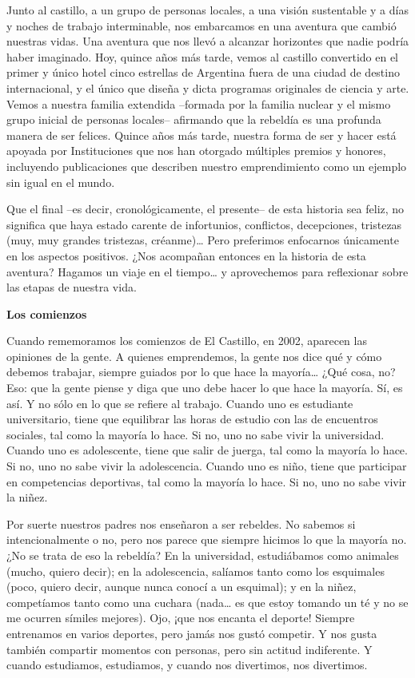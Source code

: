 Junto al castillo, a un grupo de personas locales, a una visión
sustentable y a días y noches de trabajo interminable, nos embarcamos en
una aventura que cambió nuestras vidas. Una aventura que nos llevó a
alcanzar horizontes que nadie podría haber imaginado. Hoy, quince años
más tarde, vemos al castillo convertido en el primer y único hotel cinco
estrellas de Argentina fuera de una ciudad de destino internacional, y
el único que diseña y dicta programas originales de ciencia y arte.
Vemos a nuestra familia extendida --formada por la familia nuclear y el
mismo grupo inicial de personas locales-- afirmando que la rebeldía es
una profunda manera de ser felices. Quince años más tarde, nuestra forma
de ser y hacer está apoyada por Instituciones que nos han otorgado
múltiples premios y honores, incluyendo publicaciones que describen
nuestro emprendimiento como un ejemplo sin igual en el mundo.

Que el final --es decir, cronológicamente, el presente-- de esta
historia sea feliz, no significa que haya estado carente de infortunios,
conflictos, decepciones, tristezas (muy, muy grandes tristezas,
créanme)\ldots{} Pero preferimos enfocarnos únicamente en los aspectos
positivos. ¿Nos acompañan entonces en la historia de esta aventura?
Hagamos un viaje en el tiempo\ldots{} y aprovechemos para reflexionar
sobre las etapas de nuestra vida.

\textbf{Los comienzos}

Cuando rememoramos los comienzos de El Castillo, en 2002, aparecen las
opiniones de la gente. A quienes emprendemos, la gente nos dice qué y
cómo debemos trabajar, siempre guiados por lo que hace la
mayoría\ldots{} ¿Qué cosa, no? Eso: que la gente piense y diga que uno
debe hacer lo que hace la mayoría. Sí, es así. Y no sólo en lo que se
refiere al trabajo. Cuando uno es estudiante universitario, tiene que
equilibrar las horas de estudio con las de encuentros sociales, tal como
la mayoría lo hace. Si no, uno no sabe vivir la universidad. Cuando uno
es adolescente, tiene que salir de juerga, tal como la mayoría lo hace.
Si no, uno no sabe vivir la adolescencia. Cuando uno es niño, tiene que
participar en competencias deportivas, tal como la mayoría lo hace. Si
no, uno no sabe vivir la niñez.

Por suerte nuestros padres nos enseñaron a ser rebeldes. No sabemos si
intencionalmente o no, pero nos parece que siempre hicimos lo que la
mayoría no. ¿No se trata de eso la rebeldía? En la universidad,
estudiábamos como animales (mucho, quiero decir); en la adolescencia,
salíamos tanto como los esquimales (poco, quiero decir, aunque nunca
conocí a un esquimal); y en la niñez, competíamos tanto como una cuchara
(nada\ldots{} es que estoy tomando un té y no se me ocurren símiles
mejores). Ojo, ¡que nos encanta el deporte! Siempre entrenamos en varios
deportes, pero jamás nos gustó competir. Y nos gusta también compartir
momentos con personas, pero sin actitud indiferente. Y cuando
estudiamos, estudiamos, y cuando nos divertimos, nos divertimos.

